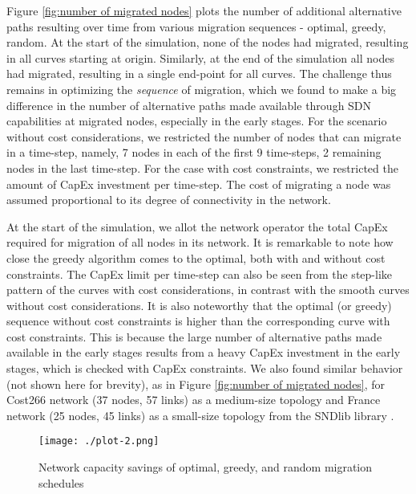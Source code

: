 \documentclass[conference]{IEEEtran}
\begin{document}
\par Figure \ref{fig:number of migrated nodes} plots the number of additional
alternative paths resulting over time from various migration sequences -
optimal, greedy, random. At the start of the simulation, none of the nodes had
migrated, resulting in all curves starting at origin.
Similarly, at the end of the simulation all nodes had migrated, resulting in a
single end-point for all curves. The challenge thus remains in optimizing the
\emph{sequence} of migration, which we found to make a big difference in
the number of alternative paths made available through SDN capabilities at
migrated nodes, especially in the early stages. For the scenario without cost
considerations, we restricted the number of nodes that can migrate in a
time-step, namely, 7 nodes in each of the first 9 time-steps, 2 remaining nodes in the
last time-step. For the case with cost constraints, we restricted the amount of
CapEx investment per time-step. The cost of migrating a node was assumed proportional to its degree of
connectivity in the network.

\par At the start of the simulation, we allot the network operator the total CapEx
required for migration of all nodes in its network. It is remarkable to note how
close the greedy algorithm comes to the optimal, both with and without cost
constraints. The CapEx limit per time-step can also be seen from the step-like
pattern of the curves with cost considerations, in contrast with the smooth
curves without cost considerations. It is also noteworthy that the optimal (or
greedy) sequence without cost constraints is higher than the corresponding
curve with cost constraints. This is because the large number of alternative
paths made available in the early stages results from a heavy CapEx investment
in the early stages, which is checked with CapEx constraints. We also found
similar behavior (not shown here for brevity), as in Figure \ref{fig:number of migrated nodes}, for Cost266
network (37 nodes, 57 links) as a medium-size topology and
France network (25 nodes, 45 links) as a small-size topology
from the SNDlib library \cite{sndlib}. 

\begin{figure}
\begin{center}
\texttt{[image: ./plot-2.png]}
\caption{Network capacity savings of optimal, greedy, and random migration
schedules}
\label{fig:capacity savings}
\end{center}
\vspace{-5mm}
\end{figure}
\end{document}
